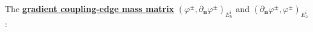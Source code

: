 \documentclass{mc2013}
\newcommand\bs{\boldsymbol}
\newcommand\tf{\varphi}
\renewcommand{\(}{\left(}
\renewcommand{\)}{\right)}
\renewcommand{\[}{\left[}
\renewcommand{\]}{\right]}
\begin{document}
\begin{itemize}
\end{itemize}
The \underline{{\bf gradient coupling-edge mass matrix}}
$(\tf^{\pm},\partial_{\bs{n}}\tf^{\pm})_{E_h^i}$ and
$(\partial_{\bs{n}}\tf^{\pm},\tf^{\pm})_{E_h^i}$ :
\end{document}
